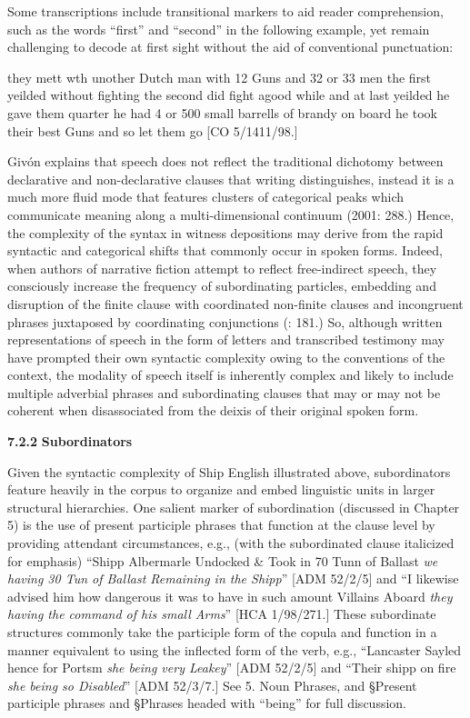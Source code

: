 Some transcriptions include transitional markers to aid reader comprehension, such as the words “first” and “second” in the following example, yet remain challenging to decode at first sight without the aid of conventional punctuation: 

they mett wth unother Dutch man with 12 Guns and 32 or 33 men the first yeilded without fighting the second did fight agood while and at last yeilded he gave them quarter he had 4 or 500 small barrells of brandy on board he took their best Guns and so let them go [CO 5/1411/98.]

Givón explains that speech does not reflect the traditional dichotomy between declarative and non-declarative clauses that writing distinguishes, instead it is a much more fluid mode that features clusters of categorical peaks which communicate meaning along a multi-dimensional continuum (2001: 288.) Hence, the complexity of the syntax in witness depositions may derive from the rapid syntactic and categorical shifts that commonly occur in spoken forms. Indeed, when authors of narrative fiction attempt to reflect free-indirect speech, they consciously increase the frequency of subordinating particles, embedding and disruption of the finite clause with coordinated non-finite clauses and incongruent phrases juxtaposed by coordinating conjunctions (\citealt{Sotirova2016}: 181.) So, although written representations of speech in the form of letters and transcribed testimony may have prompted their own syntactic complexity owing to the conventions of the context, the modality of speech itself is inherently complex and likely to include multiple adverbial phrases and subordinating clauses that may or may not be coherent when disassociated from the deixis of their original spoken form.   

  \textbf{7.2.2} \textbf{Subordinators}

  Given the syntactic complexity of Ship English illustrated above, subordinators feature heavily in the corpus to organize and embed linguistic units in larger structural hierarchies. One salient marker of subordination (discussed in Chapter 5) is the use of present participle phrases that function at the clause level by providing attendant circumstances, e.g., (with the subordinated clause italicized for emphasis) “Shipp Albermarle Undocked \& Took in 70 Tunn of Ballast \textit{we having 30 Tun of Ballast Remaining in the Shipp}” [ADM 52/2/5] and “I likewise advised him how dangerous it was to have in such amount Villains Aboard \textit{they having the command of his small Arms}” [HCA 1/98/271.] These subordinate structures commonly take the participle form of the copula and function in a manner equivalent to using the inflected form of the verb, e.g., “Lancaster Sayled hence for Portsm \textit{she being very Leakey}” [ADM 52/2/5] and “Their shipp on fire \textit{she being so Disabled}” [ADM 52/3/7.] See 5. Noun Phrases, and §Present participle phrases and §Phrases headed with “being” for full discussion.

